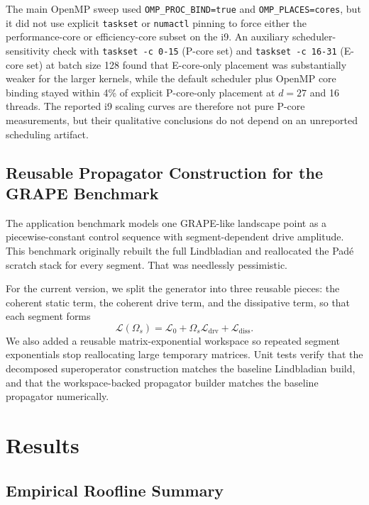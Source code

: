 \documentclass[3p,times,twocolumn]{elsarticle}
\begin{document}
The main OpenMP sweep used \texttt{OMP\_PROC\_BIND=true} and
\texttt{OMP\_PLACES=cores}, but it did not use explicit \texttt{taskset} or
\texttt{numactl} pinning to force either the performance-core or
efficiency-core subset on the i9. An auxiliary scheduler-sensitivity check
with \texttt{taskset -c 0-15} (P-core set) and \texttt{taskset -c 16-31}
(E-core set) at batch size 128 found that E-core-only placement was
substantially weaker for the larger kernels, while the default scheduler
plus OpenMP core binding stayed within 4\% of explicit P-core-only
placement at $d=27$ and 16 threads. The reported i9 scaling curves are
therefore not pure P-core measurements, but their qualitative conclusions do
not depend on an unreported scheduling artifact.

\subsection{Reusable Propagator Construction for the GRAPE Benchmark}

The application benchmark models one GRAPE-like landscape point as a
piecewise-constant control sequence with segment-dependent drive amplitude.
This benchmark originally rebuilt the full Lindbladian and reallocated the
Pad\'e scratch stack for every segment. That was needlessly pessimistic.

For the current version, we split the generator into three reusable pieces:
the coherent static term, the coherent drive term, and the dissipative term,
so that each segment forms
\begin{equation}
  \mathcal{L}(\Omega_s) = \mathcal{L}_0 + \Omega_s \mathcal{L}_{\mathrm{drv}}
  + \mathcal{L}_{\mathrm{diss}}.
\end{equation}
We also added a reusable matrix-exponential workspace so repeated segment
exponentials stop reallocating large temporary matrices. Unit tests verify
that the decomposed superoperator construction matches the baseline
Lindbladian build, and that the workspace-backed propagator builder matches
the baseline propagator numerically.

\section{Results}

\subsection{Empirical Roofline Summary}
\end{document}

